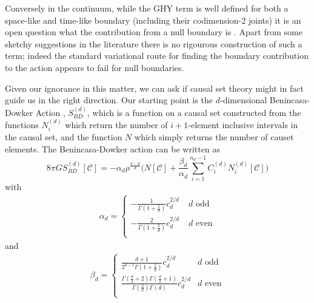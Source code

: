 \documentclass[12pt]{article}
\begin{document}
Conversely in the continuum, while the GHY term  is well defined for both a space-like and time-like boundary  (including their codimension-2 joints)  it is an open question what the contribution from a null  boundary  is \cite{Gibbons_Hawking_Boundary, Harris}. Apart from some sketchy suggestions in the literature \cite{neiman} there is no rigourous construction of such a term; indeed the standard variational route for finding the boundary contribution to the action appears to fail for null boundaries. 

Given our ignorance in this matter,  we can ask if causal set theory  might  in fact guide us in the right direction.   Our starting point is the $d$-dimensional  Benincasa-Dowker Action \cite{Benincasa_Dowker:The_Scalar_Curvature_of_a_Causal_Set, Dowker_Glaser:dAlembertians_for_Causal_Sets}, $S_{BD}^{(d)}$, which is a function on a causal set constructed from the functions $N_i^{ (d)}$ which return the number of $i+1$-element inclusive intervals in the causal set, and the function $N$ which simply returns the number of causet elements. The Benincasa-Dowker action can be written as
\begin{equation}
8 \pi G {S_{BD}^{ (d)}}\left[\mathcal C\right] = -\alpha_d \rho^{\frac{2-d}{d}}\biggl ( N[\mathcal C]+ \frac{\beta_d}{ \alpha_d} \sum_{i=1}^{n_d-1}  C^{ (d)}_{i} N _i^{ (d)}[\mathcal C] \biggr) 
\label{bd} 
\end{equation}  
with   
\begin{equation}
\begin{aligned}
 \alpha_d =   
\begin{cases}
\displaystyle
-\frac1{\Gamma\left (1+\frac2d\right)}c_d ^{2/d} \;   &d \, \, \mathrm{odd} \\
\displaystyle
- \frac{2}{\Gamma\left (1+\frac2d\right)}c_d ^{2/d}  \;   &d \, \,  \mathrm{even} \\
\end{cases}
\end{aligned}
\end{equation}
and
\begin{equation}
\begin{aligned}
\beta_d =
\begin{cases}\displaystyle
\frac{d+1}{2^{d-1}\Gamma\left (1+\frac2d\right)} c_d^{2/d}   \;   &d\mathrm{ \, \, odd}\\ 
\displaystyle
\frac{\Gamma\left (\frac{d}{2}+2\right)\Gamma\left (\frac{d}{2}+1\right)}{\Gamma\left (\frac{2}{d}\right)\Gamma\left (d\right)}c_d^{2/d}  &  d\mathrm{ \, \,  even}\\ 
\end{cases} 
\end{aligned}
\end{equation}
\end{document}
